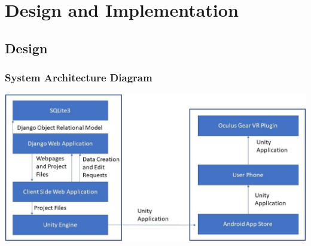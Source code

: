 \documentclass[12pt]{report}
\begin{document}
\chapter{Design and Implementation}

\section{Design}

\subsection{System Architecture Diagram}
\includegraphics[width=\textwidth]{system_arch}
\end{document}
